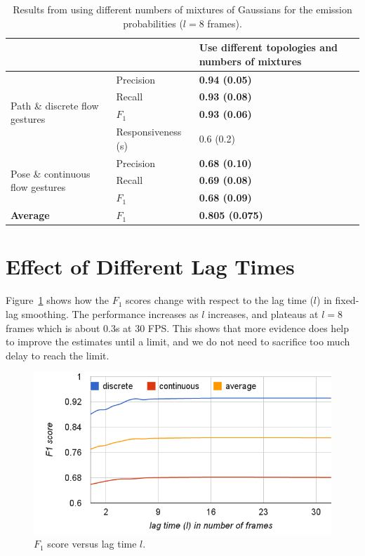 \begin{table}[tbh]
\centering
\begin{tabular}{|p{4.5cm}|l|p{4cm}|}
\hline
& & \textbf{Use different topologies and numbers of mixtures} \\
\hline
\multirow{4}{4cm}{Path \& discrete flow gestures} 
& Precision & \textbf{0.94 (0.05)} \\
\cline{2-3}
& Recall    & \textbf{0.93 (0.08)} \\
\cline{2-3}
& $F_1$ & \textbf{0.93 (0.06)} \\
\cline{2-3}
& Responsiveness (s) & 0.6 (0.2)  \\
\hline
\multirow{3}{4cm}{Pose \& continuous flow gestures}
& Precision & \textbf{0.68 (0.10)} \\
\cline{2-3}
& Recall & \textbf{0.69 (0.08)} \\
\cline{2-3}
& $F_1$ & \textbf{0.68 (0.09)}  \\
\hline
\textbf{Average} & $F_1$ & \textbf{0.805 (0.075)}\\
\hline
\end{tabular}
\caption{Results from using different numbers of mixtures of Gaussians
for the emission probabilities ($l = 8$ frames).}
\label{tab:different-mixtures}
\end{table}


\section{Effect of Different Lag Times}
Figure~\ref{fig:lag} shows how the $F_1$ scores change with respect to the lag
time ($l$) in fixed-lag smoothing. The performance increases as $l$ increases, and
plateaus at $l=8$ frames which is about 0.3s at 30 FPS. This shows that more
evidence does help to improve the estimates until a limit, and we do not need to
sacrifice too much delay to reach the limit.

\begin{figure}[!tbh]
\centering
\includegraphics[trim=7mm 2mm 0 15mm, clip,
width=\columnwidth]{figures/f1_lag.png}
\caption{$F_1$ score versus lag time $l$.}
\label{fig:lag}
\end{figure}


